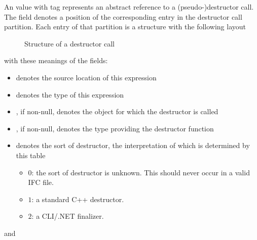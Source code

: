 An  value with tag  represents an abstract reference to 
a (pseudo-)destructor call.  The  field denotes a position of the corresponding entry in the destructor call partition.
Each entry of that partition is a structure with the following layout
%
\begin{figure}[H]
	\centering
	\caption{Structure of a destructor call}
	\label{fig:ifc-destructor-call-structure}
\end{figure}
%
with these meanings of the fields:
\begin{itemize}
	\item {} denotes the source location of this expression
	\item {} denotes the type of this expression
	\item {}, if non-null, denotes the object for which the destructor is called
	\item {}, if non-null, denotes the type providing the destructor function
	\item {} denotes the sort of destructor, the interpretation of which is determined by this table 
	\begin{itemize}
		\item $0$: the sort of destructor is unknown.  This should never occur in a valid IFC file.
		\item $1$: a standard C++ destructor.
		\item $2$: a CLI/.NET finalizer.
	\end{itemize}
\end{itemize}
and 




\subsection{}
\label{sec:ifc:ExprSort:SyntaxTree}

